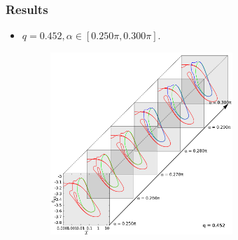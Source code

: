 \documentclass{beamer}
\begin{document}
\begin{frame}
	\frametitle{Results}
	\begin{overlayarea}{\textwidth}{\textheight}
		\begin{itemize}
			\item $q=0.452, \alpha\in [0.250\pi, 0.
			300\pi]$.
			\begin{figure}[htb]
				\begin{center}
					\includegraphics[width=0.65\textwidth]{plots/elastic_beam_I_theta_q_0.452_alpha_restart2.png}
				\end{center}
			\end{figure}
		\end{itemize}
	\end{overlayarea}
\end{frame}

\end{document}

